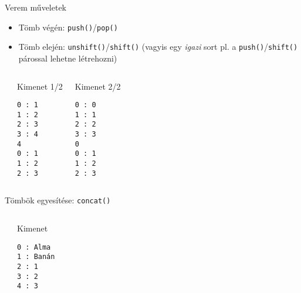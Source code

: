 \begin{frame}[fragile]
  \small
  Verem műveletek
  \begin{itemize}
    \item Tömb végén: \texttt{push()}/\texttt{pop()}
    \item Tömb elején: \texttt{unshift()}/\texttt{shift()} (vagyis egy \emph{igazi} sort pl. a \texttt{push()}/\texttt{shift()} párossal lehetne létrehozni)
  \end{itemize}
  \scriptsize
  \begin{columns}[T]
      \begin{exampleblock}{}
        
      \end{exampleblock}
      \begin{block}{Kimenet 1/2}
        \begin{verbatim}
0 : 1
1 : 2
2 : 3
3 : 4
4
0 : 1
1 : 2
2 : 3
\end{verbatim}
      \end{block}
      \begin{block}{Kimenet 2/2}
        \begin{verbatim}
0 : 0
1 : 1
2 : 2
3 : 3
0
0 : 1
1 : 2
2 : 3
\end{verbatim}
      \end{block}
  \end{columns}
\end{frame}

\begin{frame}[fragile]
  Tömbök egyesítése: \texttt{concat()}
  \vfill
  \small
  \begin{columns}[T]
      \begin{exampleblock}{}
        
      \end{exampleblock}
      \begin{block}{Kimenet}
        \begin{verbatim}
0 : Alma
1 : Banán
2 : 1
3 : 2
4 : 3
\end{verbatim}
      \end{block}
  \end{columns}
\end{frame}

